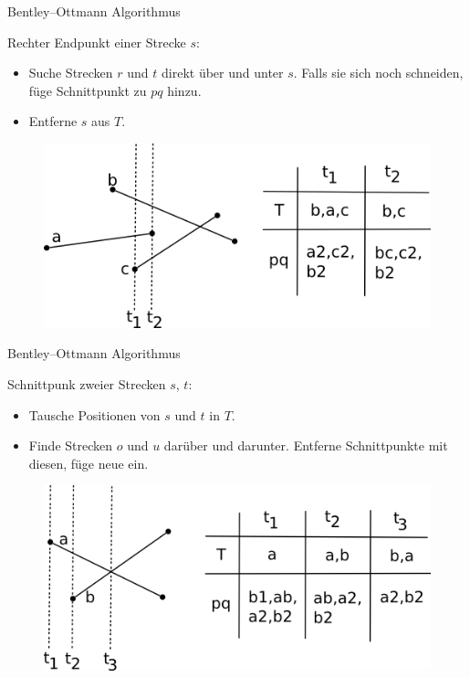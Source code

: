 \documentclass{beamer}
\begin{document}
\begin{frame}{Bentley–Ottmann Algorithmus}
	\begin{block}{Rechter Endpunkt einer Strecke $s$:}
		\begin{itemize}
			\item Suche Strecken $r$ und $t$ direkt über und unter $s$. Falls sie sich noch schneiden, füge Schnittpunkt zu $pq$ hinzu.
			\item Entferne $s$ aus $T$.
		\end{itemize}
	\end{block}
	\begin{figure}
		\includegraphics[scale=0.8]{remove.png}\\
	\end{figure}
\end{frame}

\begin{frame}{Bentley–Ottmann Algorithmus}
	\begin{block}{Schnittpunk zweier Strecken $s$, $t$:}
		\begin{itemize}
			\item Tausche Positionen von $s$ und $t$ in $T$.
			\item Finde Strecken $o$ und $u$ darüber und darunter. Entferne Schnittpunkte mit diesen, füge neue ein.
		\end{itemize}
	\end{block}
	\begin{figure}
		\includegraphics[scale=0.8]{intersect.png}\\
	\end{figure}
\end{frame}
\end{document}
